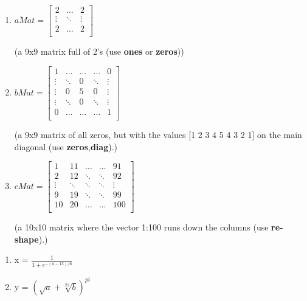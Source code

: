 \documentclass{article}
\begin{document}
\begin{latin}
	\begin{enumerate}
		\item
		$
		 aٰMat = \begin{bmatrix}
			2  & \dots &2 \\
			\vdots  & \ddots & \vdots \\
			2  & \dots &2 \\
		\end{bmatrix}
		$ 
		
		(a 9x9 matrix full of 2’s (use \textbf{ones} or \textbf{zeros}))
		\item
		$
		bMat = \begin{bmatrix}
			1  & \dots &\dots &\dots &0 \\
			\vdots  & \ddots &0&\ddots&\vdots \\
			\vdots  & 0&5&0&\vdots\\
			\vdots  & \ddots&0& \ddots&\vdots\\
			0  & \dots & \dots& \dots &1 \\
		\end{bmatrix}
		$ 
		
		(a 9x9 matrix of all zeros, but with the values [1 2 3 4 5 4 3 2 1] on the main diagonal (use \textbf{zeros},\textbf{diag}).)
		
		\item
		$
		cMat = \begin{bmatrix}
		1  & 11 &\dots &\dots &91 \\
		2  & 12 &\ddots&\ddots&92 \\
		\vdots  & \ddots&\ddots&\ddots&\vdots\\
		9  & 19&\ddots& \ddots&99\\
		10  & 20 & \dots& \dots &100 \\
		\end{bmatrix}
		$ 
		
		(a 10x10 matrix where the vector 1:100 runs down the columns (use \textbf{reshape}).)

	\end{enumerate}
\end{latin}
\begin{latin}
	\begin{enumerate}
		\item x = {\LARGE${\frac{1}{1 + e^{-(a-15)/6}}}$}
		\item y = $(\sqrt{a} + \sqrt[21]{b}) ^{pi}$
	\end{enumerate}
\end{latin}
\end{document}
